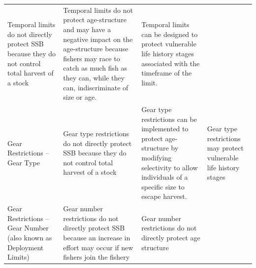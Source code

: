 \documentclass[]{book}
\begin{document}
\begin{longtable}[]{@{}llll@{}}
\begin{minipage}[t]{0.22\columnwidth}
Temporal limits do not directly protect SSB because they do not control
total harvest of a stock\strut
\end{minipage} & \begin{minipage}[t]{0.22\columnwidth}\raggedright\strut
Temporal limits do not protect age-structure and may have a negative
impact on the age-structure because fishers may race to catch as much
fish as they can, while they can, indiscriminate of size or age.\strut
\end{minipage} & \begin{minipage}[t]{0.22\columnwidth}\raggedright\strut
Temporal limits can be designed to protect vulnerable life history
stages associated with the timeframe of the limit.\strut
\end{minipage}\tabularnewline
\begin{minipage}[t]{0.22\columnwidth}\raggedright\strut
Gear Restrictions -- Gear Type\strut
\end{minipage} & \begin{minipage}[t]{0.22\columnwidth}\raggedright\strut
Gear type restrictions do not directly protect SSB because they do not
control total harvest of a stock\strut
\end{minipage} & \begin{minipage}[t]{0.22\columnwidth}\raggedright\strut
Gear type restrictions can be implemented to protect age-structure by
modifying selectivity to allow individuals of a specific size to escape
harvest.\strut
\end{minipage} & \begin{minipage}[t]{0.22\columnwidth}\raggedright\strut
Gear type restrictions may protect vulnerable life history stages\strut
\end{minipage}\tabularnewline
\begin{minipage}[t]{0.22\columnwidth}\raggedright\strut
Gear Restrictions -- Gear Number (also known as Deployment Limits)\strut
\end{minipage} & \begin{minipage}[t]{0.22\columnwidth}\raggedright\strut
Gear number restrictions do not directly protect SSB because an increase
in effort may occur if new fishers join the fishery\strut
\end{minipage} & \begin{minipage}[t]{0.22\columnwidth}\raggedright\strut
Gear number restrictions do not directly protect age structure\strut
\end{minipage} & \begin{minipage}[t]{0.22\columnwidth}\raggedright\strut

\end{minipage}
\end{longtable}
\end{document}
